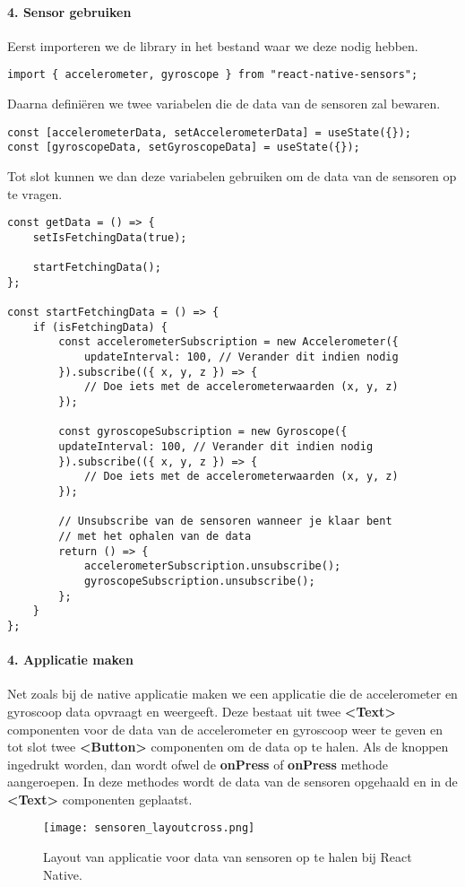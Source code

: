 \paragraph{4. Sensor gebruiken}
Eerst importeren we de library in het bestand waar we deze nodig hebben.
\begin{verbatim}
import { accelerometer, gyroscope } from "react-native-sensors";
\end{verbatim}
Daarna definiëren we twee variabelen die de data van de sensoren zal bewaren.
\begin{verbatim}
const [accelerometerData, setAccelerometerData] = useState({});
const [gyroscopeData, setGyroscopeData] = useState({});
\end{verbatim}
Tot slot kunnen we dan deze variabelen gebruiken om de data van de sensoren op te vragen.
\begin{verbatim}
const getData = () => {
    setIsFetchingData(true);

    startFetchingData();
};

const startFetchingData = () => {
    if (isFetchingData) {
        const accelerometerSubscription = new Accelerometer({
            updateInterval: 100, // Verander dit indien nodig
        }).subscribe(({ x, y, z }) => {
            // Doe iets met de accelerometerwaarden (x, y, z)
        });

        const gyroscopeSubscription = new Gyroscope({
        updateInterval: 100, // Verander dit indien nodig
        }).subscribe(({ x, y, z }) => {
            // Doe iets met de accelerometerwaarden (x, y, z)
        });

        // Unsubscribe van de sensoren wanneer je klaar bent 
        // met het ophalen van de data
        return () => {
            accelerometerSubscription.unsubscribe();
            gyroscopeSubscription.unsubscribe();
        };
    }
};
\end{verbatim}

\paragraph{4. Applicatie maken}
Net zoals bij de native applicatie maken we een applicatie die de accelerometer en gyroscoop data 
opvraagt en weergeeft. Deze bestaat uit twee \textbf{<Text>} componenten voor de data van de
accelerometer en gyroscoop weer te geven en tot slot twee \textbf{<Button>} componenten om de 
data op te halen. Als de knoppen ingedrukt worden, dan wordt ofwel de
\textbf{onPress} of \textbf{onPress} methode aangeroepen. In deze methodes wordt de data 
van de sensoren opgehaald en in de \textbf{<Text>} componenten geplaatst.
\begin{figure}[H]
    \centering
    \texttt{[image: sensoren\_layoutcross.png]}
    \caption{Layout van applicatie voor data van sensoren op te halen bij React Native.}
\end{figure}